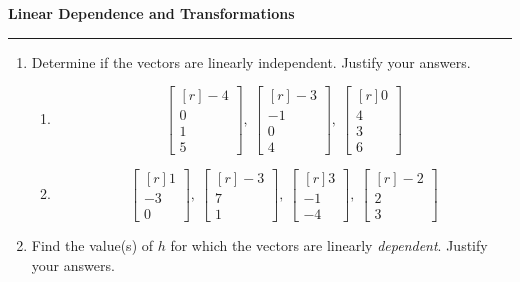 \documentclass[12pt]{article}
\begin{document}
\begin{center}
{\bf \Large Linear Dependence and Transformations}
\vspace{0.2cm}
\hrule
\end{center}



\begin{multicols*}{2}
	\begin{enumerate}
		\item Determine if the vectors are linearly independent. Justify your answers.
		\begin{enumerate}
			\item \[
				\begin{bmatrix*}[r]
					-4\\0\\1\\5
				\end{bmatrix*},\ \begin{bmatrix*}[r]
					-3\\-1\\0\\4	
				\end{bmatrix*},\ \begin{bmatrix*}[r]
					0\\4\\3\\6
				\end{bmatrix*}
			\]
			\vfill
			\item \[
				\begin{bmatrix*}[r]
					1\\-3\\0
				\end{bmatrix*},\ \begin{bmatrix*}[r]
					-3\\7\\1
				\end{bmatrix*},\ \begin{bmatrix*}[r]
					3\\-1\\-4
				\end{bmatrix*},\ \begin{bmatrix*}[r]
					-2\\2\\3
				\end{bmatrix*}
			\]
		\end{enumerate}
		\vfill
		\item Find the value(s) of $h$ for which the vectors are linearly \textit{dependent}. Justify your answers.

\end{enumerate}
\end{multicols*}
\end{document}
